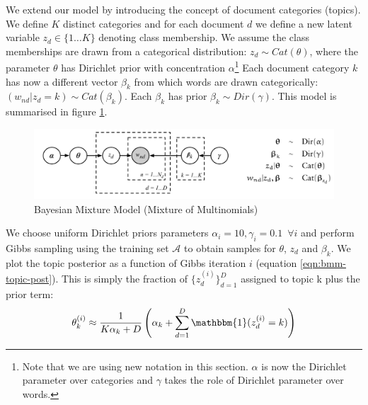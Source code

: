 \documentclass[]{article}
\newcommand{\Acal}{\mathcal{A}}
\begin{document}
We extend our model by introducing the concept of document categories (topics). We define $K$ distinct categories and for each document $d$ we define a new latent variable $z_d \in \{1 \dots K\}$ denoting class membership. We assume the class memberships are drawn from a categorical distribution: $z_d \sim Cat(\theta)$, where the parameter $\theta$ has Dirichlet prior with concentration $\alpha$\footnote{Note that we are using new notation in this section. $\alpha$ is now the Dirichlet parameter over categories and $\gamma$ takes the role of Dirichlet parameter over words.} Each document category $k$ has now a different vector $\beta_k$ from which words are drawn categorically: $(w_{nd} | z_d = k) \sim Cat(\beta_k)$. Each $\beta_k$ has prior $\beta_k \sim Dir(\gamma)$. This model is summarised in figure \ref{fig:bayesian-mixture}.
%
\begin{figure}[!h]
	\centering
	\includegraphics[width=0.6\linewidth]{bayesian-mixture.png}
	\caption{Bayesian Mixture Model (Mixture of Multinomials)}
	\label{fig:bayesian-mixture}
\end{figure}

We choose uniform Dirichlet priors parameters $\alpha_i = 10, \gamma_i = 0.1 \enspace \forall i$ and perform Gibbs sampling using the training set $\Acal$ to obtain samples for $\theta$, $z_d$ and $\beta_k$. We plot the topic posterior as a function of Gibbs iteration $i$ (equation \ref{eqn:bmm-topic-post}). This is simply the fraction of $\{z_d^{(i)}\}_{d=1}^{D}$ assigned to topic k plus the prior term:
%
\begin{equation}
	\theta^{(i)}_k \approx \frac{1}{K\alpha_k + D} \left( \alpha_k + \sum_{d=1}^{D} \mathbbm{1}(z^{(i)}_d = k) \right)
	\label{eqn:bmm-topic-post}
\end{equation}
\end{document}
